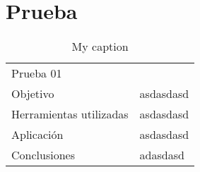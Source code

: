 \section{Prueba}



\begin{table}[prueba01]
	\centering
	\caption{My caption}
	\label{my-label}
	\begin{tabular}{ll}
		\multicolumn{2}{l}{Prueba 01} \\
		Objetivo                  &  asdasdasd \\
		Herramientas utilizadas   &  asdasdasd \\
		Aplicación                &  asdasdasd \\
		Conclusiones              &  adasdasd
	\end{tabular}
\end{table}